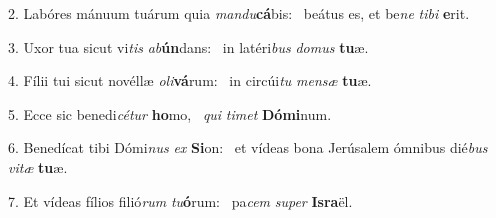 2. Labóres mánuum tuárum quia \textit{man}\textit{du}\textbf{cá}bis: \ast\  beátus es, et be\textit{ne} \textit{ti}\textit{bi} \textbf{e}rit.\

3. Uxor tua sicut vi\textit{tis} \textit{ab}\textbf{ún}dans: \ast\  in latéri\textit{bus} \textit{do}\textit{mus} \textbf{tu}æ.\

4. Fílii tui sicut novéllæ \textit{o}\textit{li}\textbf{vá}rum: \ast\  in circúi\textit{tu} \textit{men}\textit{sæ} \textbf{tu}æ.\

5. Ecce sic benedi\textit{cé}\textit{tur} \textbf{ho}mo, \ast\  \textit{qui} \textit{ti}\textit{met} \textbf{Dó}\textbf{mi}num.\

6. Benedícat tibi Dómi\textit{nus} \textit{ex} \textbf{Si}on: \ast\  et vídeas bona Jerúsalem ómnibus dié\textit{bus} \textit{vi}\textit{tæ} \textbf{tu}æ.\

7. Et vídeas fílios filió\textit{rum} \textit{tu}\textbf{ó}rum: \ast\  pa\textit{cem} \textit{su}\textit{per} \textbf{Is}\textbf{ra}ël.\

